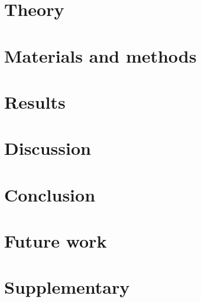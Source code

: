 \documentclass[10pt]{article}
\begin{document}
	\section{Theory}
	
	\label{section:Chap_PMT}
	\newpage
	
	
	\label{section:Chap_Monte_Carlo}
	\newpage
	
	
	\label{section:Chap_Cell_Death}
	\newpage
	
	\section{Materials and methods}
	
	\label{section:Chap_Material_and_Methods}
	\newpage
	
	\section{Results}
	
	\label{section:Chap_Results}
	\newpage
	
	\section{Discussion}
	
	\label{section:Chap_Discussion}
	\newpage
	
	\section{Conclusion}
	
	\label{section:Chap_Conclusion}
	\section{Future work}
	
	\label{section:Chap_Future_Work}
	\newpage
	
	
	\printbibliography
	\newpage
	
	\section*{Supplementary}
	
	\label{section:Chap_Supplementary}
	\newpage
	

	
	
\end{document}
